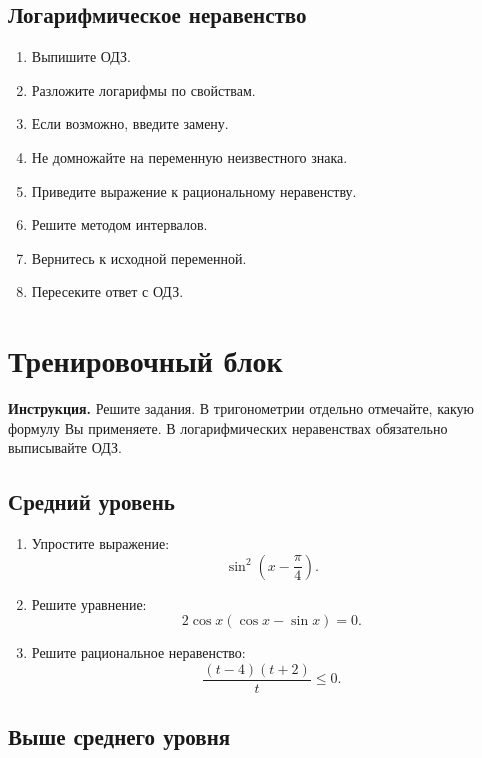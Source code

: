 \documentclass[a4paper,12pt]{article}
\begin{document}
\subsection*{Логарифмическое неравенство}

\begin{enumerate}
    \item Выпишите ОДЗ.
    \item Разложите логарифмы по свойствам.
    \item Если возможно, введите замену.
    \item Не домножайте на переменную неизвестного знака.
    \item Приведите выражение к рациональному неравенству.
    \item Решите методом интервалов.
    \item Вернитесь к исходной переменной.
    \item Пересеките ответ с ОДЗ.
\end{enumerate}

\newpage

\section*{Тренировочный блок}

\textbf{Инструкция.} Решите задания. В тригонометрии отдельно отмечайте, какую формулу Вы применяете. В логарифмических неравенствах обязательно выписывайте ОДЗ.

\subsection*{Средний уровень}

\begin{enumerate}
    \item Упростите выражение:
    \[
    \sin^2\left(x-\frac{\pi}{4}\right).
    \]

    \item Решите уравнение:
    \[
    2\cos x(\cos x-\sin x)=0.
    \]

    \item Решите рациональное неравенство:
    \[
    \frac{(t-4)(t+2)}{t}\le0.
    \]
\end{enumerate}

\subsection*{Выше среднего уровня}
\end{document}

